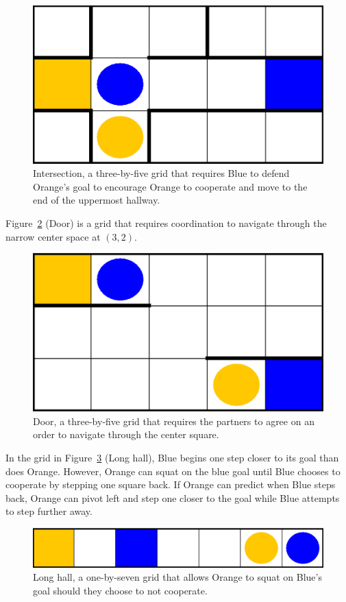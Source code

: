 \documentclass[letterpaper]{article}
\begin{document}
\begin{figure}
\centering
\includegraphics[width=0.71\columnwidth]{figures/threebyfivehallways.png}
\caption{Intersection, a three-by-five grid that requires Blue
to defend Orange's goal to encourage Orange to cooperate and move to
the end of the uppermost hallway.}
\label{fig:threebyfivehallways}
\end{figure}

Figure~\ref{fig:threebyfivewindow} (Door) is a grid that requires
coordination to navigate through the narrow center space at $(3,2)$.

\begin{figure}
\centering
\includegraphics[width=0.71\columnwidth]{figures/threebyfivewindow.png}
\caption{Door, a three-by-five grid that requires the partners
to agree on an order to navigate through the center square.}
\label{fig:threebyfivewindow}
\end{figure}

In the grid in Figure~\ref{fig:longhallway} (Long hall), Blue begins
one step closer to its goal than does Orange. However, 
Orange can squat on the blue goal until Blue chooses
to cooperate by stepping one square back. If Orange can predict
when Blue steps back, Orange can pivot left and step one closer to the
goal while Blue attempts to step further away.

\begin{figure}
\centering
\includegraphics[width=1.0\columnwidth]{figures/longhallway.png}
\caption{Long hall, a one-by-seven grid that allows Orange to squat on
Blue's goal should they choose to not cooperate.}
\label{fig:longhallway}
\end{figure}
\end{document}
